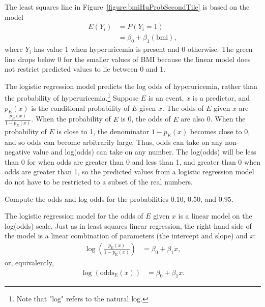 The least squares line in Figure~\ref{figure:bmiHuProbSecondTile} is based on the model
\begin{align*}
  E(Y_i) &= P(Y_i = 1) \\
         &= \beta_0 + \beta_1 (\text{bmi}),
\end{align*}
where $Y_i$ has value 1 when hyperuricemia is present and 0 otherwise.  The green line drops below 0 for the smaller values of BMI because the linear model does not restrict predicted values to lie between 0 and 1.

The logistic regression model predicts the log odds of hyperuricemia, rather than the probability of hyperuricemia.\footnote{Note that "log" refers to the natural log.} Suppose $E$ is an event, $x$ is a predictor, and $p_{E}(x)$ is the conditional probability of $E$ given $x$. The odds of $E$ given $x$ are $\frac{p_{E}(x)}{1 - p_{E}(x)}$. When the probability of $E$ is 0, the odds of $E$ are also 0. When the probability of $E$ is close to 1, the denominator $1 - p_{E}(x)$ becomes close to 0, and so odds can become arbitrarily large. Thus, odds can take on any non-negative value and log(odds) can take on any number. The log(odds) will be less than 0 for when odds are greater than 0 and less than 1, and greater than 0 when odds are greater than 1, so the predicted values from a logistic regression model do not have to be restricted to a subset of the real numbers.

\begin{exercisewrap}
\begin{nexercise}
  Compute the odds and log odds for the probabilities $0.10$, $0.50$, and $0.95$.\footnotemark{}
\end{nexercise}
\end{exercisewrap}

The logistic regression model for the odds of $E$ given $x$ is a linear model on the log(odds) scale. Just as in least squares linear regression, the right-hand side of the model is a linear combination of parameters (the intercept and slope) and $x$: 
\begin{align}
   \log\left(\frac{p_{\text{E}}(x)}
  {1 - p_\text{E}(x)}\right) &= \beta_0 + \beta_1 x,
  \label{eqn:logOddsLogisticRegression}
\end{align}
or, equivalently,
\begin{align}
 \log(\text{odds}_\text{E}(x)) &= \beta_0 + \beta_1 x.
   \label{eqn:logOddsLogisticRegressionEquiv}
\end{align}

